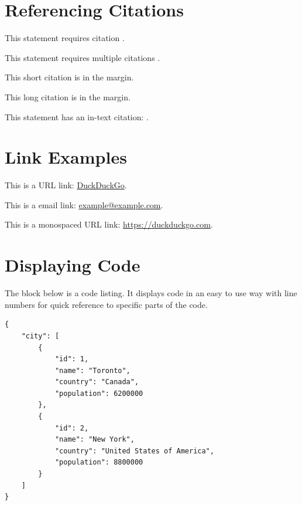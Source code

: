 \documentclass[
	a4paper, %
	12pt, %
]{include/CSSullivanBusinessReport}
\begin{document}

\section{Referencing Citations}

This statement requires citation \autocite{Smith:2024jd}.

This statement requires multiple citations \autocite{Smith:2024jd, Smith:2023qr}.

This short citation is in the margin.

This long citation is in the margin.

This statement has an in-text citation: \textcite{Smith:2024jd}.


\section{Link Examples}

This is a URL link: \href{https://www.duckduckgo.com}{DuckDuckGo}.

This is a email link: \href{mailto:example@example.com}{example@example.com}.

This is a monospaced URL link: \url{https://duckduckgo.com}.



\section{Displaying Code}

The block below is a code listing. It displays code in an easy to use way with line numbers for quick reference to specific parts of the code.

\begin{lstlisting}
{
	"city": [
		{
			"id": 1,
			"name": "Toronto",
			"country": "Canada",
			"population": 6200000
		},
		{
			"id": 2,
			"name": "New York",
			"country": "United States of America",
			"population": 8800000
		}
	]
}
\end{lstlisting}
\end{document}
